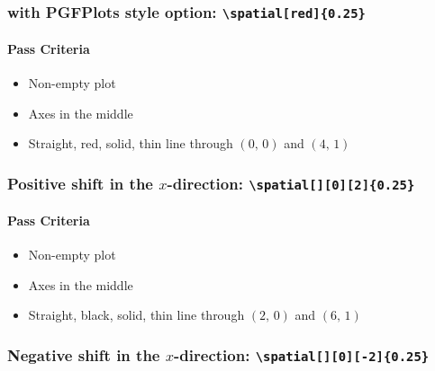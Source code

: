 \documentclass[pagesize,headsepline,parskip=half]{scrartcl}
\begin{document}
          \subsubsection{with PGFPlots style option: \texttt{\textbackslash{}spatial[red]\{0.25\}}}
            \begin{spacetimediagram}[grid, ymax=4]
            \end{spacetimediagram}

            \paragraph{Pass Criteria}
              \begin{itemize}
                \item Non-empty plot
                \item Axes in the middle
                \item Straight, red, solid, thin line through $(0, \, 0)$ and $(4, \, 1)$
              \end{itemize}

          \subsubsection{Positive shift in the $x$-direction: \texttt{\textbackslash{}spatial[][0][2]\{0.25\}}}
            \begin{spacetimediagram}[grid, xmax=8, ymax=2, domain=-2:8]
            \end{spacetimediagram}

            \paragraph{Pass Criteria}
              \begin{itemize}
                \item Non-empty plot
                \item Axes in the middle
                \item Straight, black, solid, thin line through $(2, \, 0)$ and $(6, \, 1)$
              \end{itemize}

          \subsubsection{Negative shift in the $x$-direction: \texttt{\textbackslash{}spatial[][0][-2]\{0.25\}}}
            \begin{spacetimediagram}[grid, ymin=-4, ymax=4]
            \end{spacetimediagram}
\end{document}
